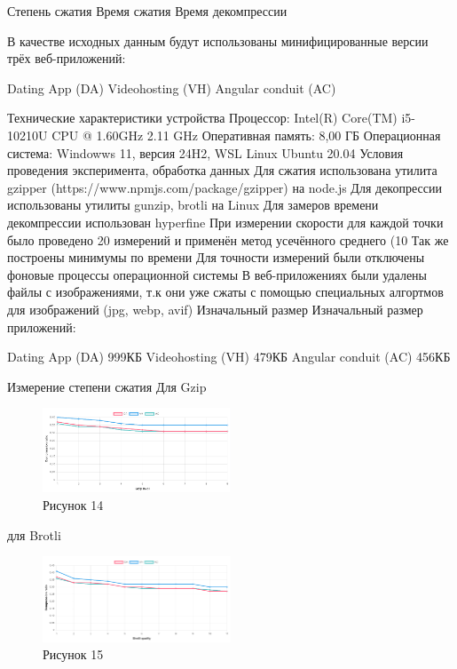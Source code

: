 \documentclass[12pt]{article}
\begin{document}
    Степень сжатия
    Время сжатия
    Время декомпрессии

    В качестве исходных данным будут использованы минифицированные версии трёх веб-приложений:

    Dating App (DA)
    Videohosting (VH)
    Angular conduit (AC)

    Технические характеристики устройства
    Процессор: Intel(R) Core(TM) i5-10210U CPU @ 1.60GHz 2.11 GHz
    Оперативная память: 8,00 ГБ
    Операционная система: Windowws 11, версия 24H2, WSL Linux Ubuntu 20.04
    Условия проведения эксперимента, обработка данных
    Для сжатия использована утилита gzipper (https://www.npmjs.com/package/gzipper) на node.js
    Для декопрессии использованы утилиты gunzip, brotli на Linux
    Для замеров времени декомпрессии использован hyperfine
    При измерении скорости для каждой точки было проведено 20 измерений и применён метод усечённого среднего (10%
    Так же построены минимумы по времени
    Для точности измерений были отключены фоновые процессы операционной системы
    В веб-приложениях были удалены файлы с изображениями, т.к они уже сжаты с помощью специальных алгортмов для изображений (jpg, webp, avif)
    Изначальный размер
    Изначальный размер приложений:

    Dating App (DA) 999КБ
    Videohosting (VH) 479КБ
    Angular conduit (AC) 456КБ

    Измерение степени сжатия
    Для Gzip
    \begin{figure}[h!]
        \centering
        \includegraphics[width=0.5\textwidth]{../images/gzip_compress_ratio.png}
        \caption{Рисунок 14}
    \end{figure}

    для Brotli
    \begin{figure}[h!]
        \centering
        \includegraphics[width=0.5\textwidth]{../images/brotli_compressed_ratio.png}
        \caption{Рисунок 15}
    \end{figure}
\end{document}
